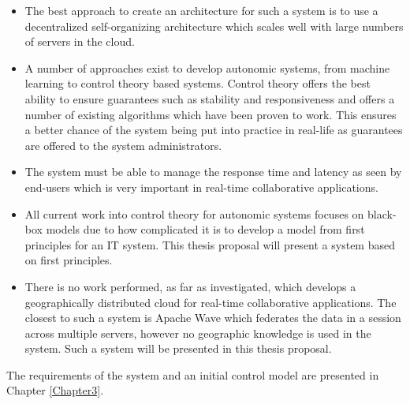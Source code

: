 \begin{itemize}
	\item The best approach to create an architecture for such a system is to use a decentralized self-organizing architecture which scales well with large numbers of servers in the cloud.
	\item A number of approaches exist to develop autonomic systems, from machine learning to control theory based systems. Control theory offers the best ability to ensure guarantees such as stability and responsiveness and offers a number of existing algorithms which have been proven to work. This ensures a better chance of the system being put into practice in real-life as guarantees are offered to the system administrators.
	\item The system must be able to manage the response time and latency as seen by end-users which is very important in real-time collaborative applications.
	\item All current work into control theory for autonomic systems focuses on black-box models due to how complicated it is to develop a model from first principles for an IT system. This thesis proposal will present a system based on first principles.
	\item There is no work performed, as far as investigated, which develops a geographically distributed cloud for real-time collaborative applications. The closest to such a system is Apache Wave which federates the data in a session across multiple servers, however no geographic knowledge is used in the system. Such a system will be presented in this thesis proposal.
\end{itemize}

The requirements of the system and an initial control model are presented in Chapter \ref{Chapter3}.